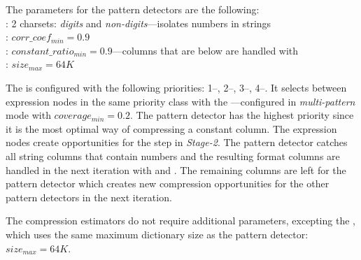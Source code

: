 The parameters for the pattern detectors are the following:\\
: 2 charsets: \textit{digits} and \textit{non-digits}---isolates numbers in strings\\
: \(corr\_coef_{min} = 0.9\)\\
: \(constant\_ratio_{min} = 0.9\)---columns that are below are handled with \\
: \(size_{max} = 64K\)

The  is configured with the following priorities: 1--, 2--, 3--, 4--.
It selects between expression nodes in the same priority class with the ---configured in \textit{multi-pattern} mode with \(coverage_{min} = 0.2\). The  pattern detector has the highest priority since it is the most optimal way of compressing a constant column. The  expression nodes create opportunities for the   step in \textit{Stage-2}. The  pattern detector catches all string columns that contain numbers and the resulting format columns are handled in the next iteration with  and . The remaining columns are left for the  pattern detector which creates new compression opportunities for the other pattern detectors in the next iteration.

The compression estimators do not require additional parameters, excepting the , which uses the same maximum dictionary size as the  pattern detector: \(size_{max} = 64K\).


